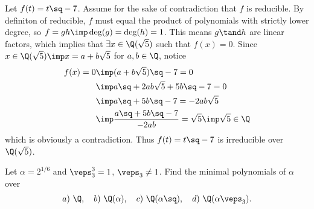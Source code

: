 \documentclass{article}
\begin{document}
\begin{solution}
Let $ f(t) = t\sq - 7 $.
Assume for the sake of contradiction that $ f $ is reducible.
By definiton of reducible, $ f $ must equal the product of polynomials with strictly lower degree, so $ f=gh \imp \deg(g) = \deg(h) = 1 $.
This means $ g\tand h $ are linear factors, which implies that $ \exists x\in \Q(\sqrt 5) $ such that $ f(x) = 0 $.
Since $ x\in \Q(\sqrt 5) \imp x=a+b\sqrt 5$ for $ a,b\in \Q $, notice \begin{align*}
  f(x) = 0 &\imp (a+b\sqrt{5})\sq - 7 = 0 \\
  &\imp a\sq + 2ab\sqrt 5 + 5b\sq - 7 = 0 \\
  &\imp a\sq + 5b\sq - 7 = - 2ab\sqrt 5 \\
  &\imp \frac{a\sq + 5b\sq - 7}{-2ab} = \sqrt 5 \imp \sqrt 5\in \Q
\end{align*}
which is obviously a contradiction.
Thus $ f(t) = t\sq - 7 $ is irreducible over $ \Q(\sqrt 5) $.
\end{solution}

\begin{subexercise}
Let $ \alpha=2^{1/6} $ and $ \veps_3^3=1 $, $ \veps_3\neq 1 $. Find the minimal polynomials of $ \alpha $ over \begin{align*}
  a)\ \Q, \quad b)\ \Q(\alpha), \quad c)\ \Q(\alpha\sq), \quad d)\ \Q(\alpha\veps_3).
\end{align*}
\end{subexercise}
\end{document}
